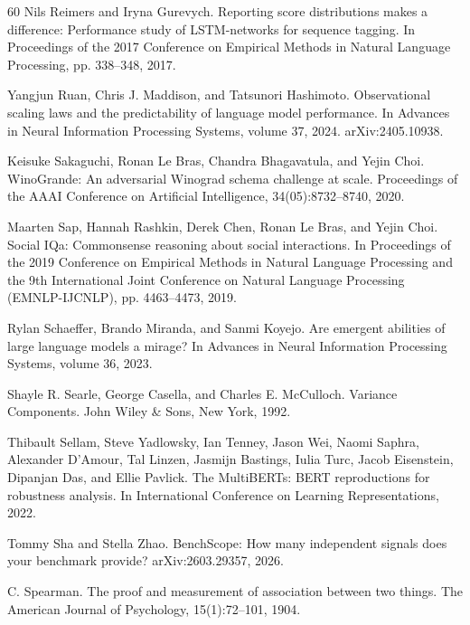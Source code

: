 \begin{thebibliography}{60}
Nils Reimers and Iryna Gurevych. Reporting score distributions makes a difference: Performance study of LSTM-networks for sequence tagging. In Proceedings of the 2017 Conference on Empirical Methods in Natural Language Processing, pp. 338--348, 2017.

Yangjun Ruan, Chris J. Maddison, and Tatsunori Hashimoto. Observational scaling laws and the predictability of language model performance. In Advances in Neural Information Processing Systems, volume 37, 2024. arXiv:2405.10938.

Keisuke Sakaguchi, Ronan Le Bras, Chandra Bhagavatula, and Yejin Choi. WinoGrande: An adversarial Winograd schema challenge at scale. Proceedings of the AAAI Conference on Artificial Intelligence, 34(05):8732--8740, 2020.

Maarten Sap, Hannah Rashkin, Derek Chen, Ronan Le Bras, and Yejin Choi. Social IQa: Commonsense reasoning about social interactions. In Proceedings of the 2019 Conference on Empirical Methods in Natural Language Processing and the 9th International Joint Conference on Natural Language Processing (EMNLP-IJCNLP), pp. 4463--4473, 2019.

Rylan Schaeffer, Brando Miranda, and Sanmi Koyejo. Are emergent abilities of large language models a mirage? In Advances in Neural Information Processing Systems, volume 36, 2023.

Shayle R. Searle, George Casella, and Charles E. McCulloch. Variance Components. John Wiley \& Sons, New York, 1992.

Thibault Sellam, Steve Yadlowsky, Ian Tenney, Jason Wei, Naomi Saphra, Alexander D'Amour, Tal Linzen, Jasmijn Bastings, Iulia Turc, Jacob Eisenstein, Dipanjan Das, and Ellie Pavlick. The MultiBERTs: BERT reproductions for robustness analysis. In International Conference on Learning Representations, 2022.

Tommy Sha and Stella Zhao. BenchScope: How many independent signals does your benchmark provide? arXiv:2603.29357, 2026.

C. Spearman. The proof and measurement of association between two things. The American Journal of Psychology, 15(1):72--101, 1904.


\end{thebibliography}
